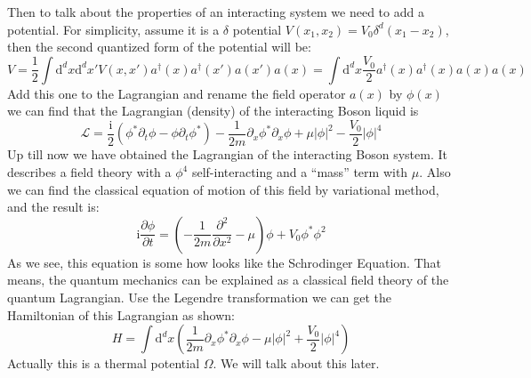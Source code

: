 \documentclass{article}
\newcommand{\im}{\mathrm{i}}
\newcommand{\ud}{\mathrm{d}}
\begin{document}
Then to talk about the properties of an interacting system we need to add a potential. For simplicity, assume it is a $\delta$ potential $V(x_1,x_2) = V_0 \delta^d(x_1-x_2) $, then the second quantized form of the potential will be:
$$
V = \frac{1}{2}\int \ud^dx\ud^dx' V(x,x')a^\dagger(x)a^\dagger(x') a(x')a(x) = \int \ud^dx \frac{V_0}{2}a^\dagger(x)a^\dagger(x)a(x)a(x)
$$
Add this one to the Lagrangian and rename the field operator $a(x)$ by $\phi(x)$ we can find that the Lagrangian (density) of the interacting Boson liquid is
\begin{equation}
\mathcal{L} = \frac{\im}{2}\left(\phi^*\partial_t \phi -\phi \partial_t \phi^*\right)-\frac{1}{2m}\partial_x\phi^*\partial_x\phi +\mu |\phi|^2 -\frac{V_0}{2}|\phi|^4
\end{equation}
Up till now we have obtained the Lagrangian of the interacting Boson system. It describes a field theory with a $\phi^4$ self-interacting and a ``mass'' term with $\mu$.
Also we can find the classical equation of motion of this field by variational method, and the result is:
\begin{equation}
\im \frac{\partial \phi}{\partial t} = \left(-\frac{1}{2m}\frac{\partial^2}{\partial x^2}-\mu\right)\phi +V_0\phi^*\phi^2
\end{equation}
As we see, this equation is some how looks like the Schrodinger Equation. That means, the quantum mechanics can be explained as a classical field theory of the quantum Lagrangian. Use the Legendre transformation we can get the Hamiltonian of this Lagrangian as shown:
\begin{equation}
H =\int \ud^dx \left(\frac{1}{2m}\partial_x\phi^*\partial_x\phi -\mu |\phi|^2 +\frac{V_0}{2}|\phi|^4\right)
\end{equation}
Actually this is a thermal potential $\Omega$. We will talk about this later.
\end{document}
